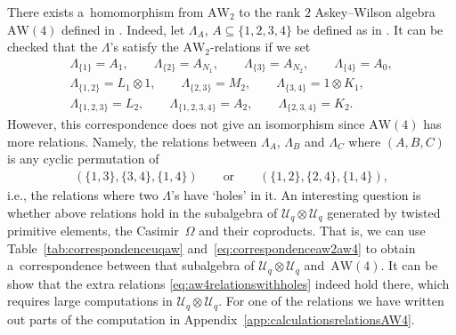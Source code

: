 \documentclass[pdftex]{sigma}
\numberwithin{equation}{section}
\newcommand{\AW}[1]{\mathrm{AW}_{#1}}
\newcommand{\Uq}{\mathcal{U}_q}
\begin{document}
\begin{Remark}\label{rem:correspondenceaw4aw2}
	There exists a~homomorphism from $\AW{2}$ to the rank $2$ Askey--Wilson algebra $\mathrm{AW}(4)$ defined in \cite{DeBie2020}. Indeed, let $\Lambda_A$, $A \subseteq \{1,2,3,4\}$ be defined as in \cite[Section~2.3]{DeBie2020}. It can be checked that the $\Lambda$'s satisfy the $\AW{2}$-relations if we set
	\begin{gather}
		\Lambda_{\{1\}}=A_1, \qquad \Lambda_{\{2\}}=A_{N_1},\qquad \Lambda_{\{3\}}=A_{N_2}, \qquad \Lambda_{\{4\}}=A_0, \nonumber\\
		\Lambda_{\{1,2\}}=L_1\otimes 1, \qquad \Lambda_{\{2,3\}} =M_2, \qquad \Lambda_{\{3,4\}} =1\otimes K_1, \label{eq:correspondenceaw2aw4}\\
		\Lambda_{\{1,2,3\}}=L_2, \qquad \Lambda_{\{1,2,3,4\}} =A_2, \qquad \Lambda_{\{2,3,4\}}=K_2.\nonumber
	\end{gather}
	However, this correspondence does not give an isomorphism since $\mathrm{AW}(4)$ has more relations. Namely, the relations between $\Lambda_A$, $\Lambda_B$ and $\Lambda_C$ where $(A,B,C)$ is any cyclic permutation of
	\begin{gather}
		(\{1,3\},\{3,4\},\{1,4\})\qquad \text{or}\qquad (\{1,2\},\{2,4\},\{1,4\})\label{eq:aw4relationswithholes},
	\end{gather}
	i.e., the relations where two $\Lambda$'s have `holes' in it. An interesting question is whether above relations hold in the subalgebra of $\Uq\otimes \Uq$ generated by twisted primitive elements, the Casimir~$\Omega$ and their coproducts. That is, we can use Table~\ref{tab:correspondenceuqaw} and~\eqref{eq:correspondenceaw2aw4} to obtain a~correspondence between that subalgebra of $\Uq\otimes\Uq$ and~$\mathrm{AW}(4)$. It can be show that the extra relations \eqref{eq:aw4relationswithholes} indeed hold there, which requires large computations in $\Uq\otimes \Uq$. For one of the relations we have written out parts of the computation in Appendix~\ref{app:calculationsrelationsAW4}.
	

\end{Remark}
\end{document}
